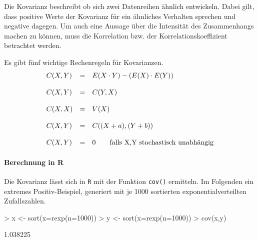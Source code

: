 Die \gls{Kovarianz} beschreibt ob sich zwei Datenreihen ähnlich 
entwickeln. Dabei gilt, dass positive Werte der Kovarianz für ein 
ähnliches Verhalten sprechen und negative dagegen. Um auch eine
Aussage über die Intensität des Zusammenhangs machen zu können,
muss die Korrelation bzw. der Korrelationskoeffizient betrachtet 
werden.

Es gibt fünf wichtige Rechenregeln für Kovarianzen.
\[ \begin{array}{l c l}
	C(X,Y) 
		& =
		& E(X \cdot Y) - (E(X) \cdot E(Y)) \\
	& & \\
	C(X,Y) 
		& =
		& C(Y,X) \\
	& & \\
	C(X,X) 
		& =
		& V(X) \\
	& & \\
	C(X,Y)
		& = 
		& C((X+a),(Y+b)) \\
	& & \\
	C(X,Y) 
		& =
		& 0 \qquad \text{falls } $X,Y$ \text{ stochastisch unabhängig} \\
\end{array} \]

\paragraph{Berechnung in R}
Die Kovarianz lässt sich in \lstinline{R} mit der Funktion 
\lstinline{cov()} ermitteln. Im Folgenden ein extremes 
Positiv-Beispiel, generiert mit je 1000 sortierten 
exponentialverteilten Zufallszahlen. 
\begin{Schunk}
\begin{Sinput}
> x <- sort(x=rexp(n=1000))
> y <- sort(x=rexp(n=1000))
> cov(x,y)
\end{Sinput}
\begin{Soutput}
[1] 1.038225
\end{Soutput}
\end{Schunk}

